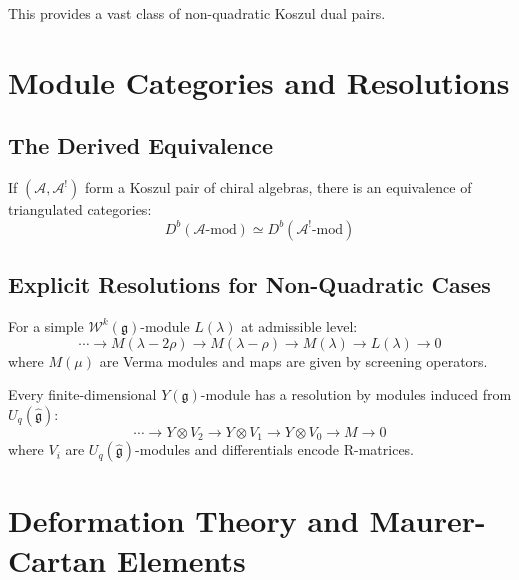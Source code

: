 This provides a vast class of non-quadratic Koszul dual pairs.


\section{Module Categories and Resolutions}

\subsection{The Derived Equivalence}

\begin{theorem}
If $(\mathcal{A}, \mathcal{A}^!)$ form a Koszul pair of chiral algebras, there is an equivalence of triangulated categories:
\[
D^b(\mathcal{A}\text{-mod}) \simeq D^b(\mathcal{A}^!\text{-mod})
\]
\end{theorem}

\subsection{Explicit Resolutions for Non-Quadratic Cases}

\begin{example}
For a simple $\mathcal{W}^k(\mathfrak{g})$-module $L(\lambda)$ at admissible level:
\[
\cdots \to M(\lambda - 2\rho) \to M(\lambda - \rho) \to M(\lambda) \to L(\lambda) \to 0
\]
where $M(\mu)$ are Verma modules and maps are given by screening operators.
\end{example}

\begin{example}
Every finite-dimensional $Y(\mathfrak{g})$-module has a resolution by modules induced from $U_q(\hat{\mathfrak{g}})$:
\[
\cdots \to Y \otimes V_2 \to Y \otimes V_1 \to Y \otimes V_0 \to M \to 0
\]
where $V_i$ are $U_q(\hat{\mathfrak{g}})$-modules and differentials encode R-matrices.
\end{example}


\section{Deformation Theory and Maurer-Cartan Elements}

